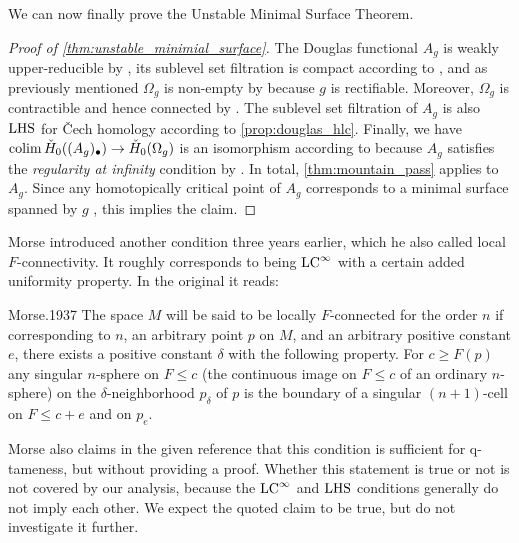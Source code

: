 We can now finally prove the Unstable Minimal Surface Theorem.


\begin{proof}[Proof of \cref{thm:unstable_minimial_surface}]
    The Douglas functional $A_g$ is weakly upper-reducible by \cite[Theorem 5.1]{Morse.1939}, its sublevel set filtration is compact according to \cite[p.~448]{Morse.1939}, and as previously mentioned $\Omega_g$ is non-empty by \cite[p.~267-268]{Douglas.1931} because $g$ is rectifiable.
    Moreover, $\Omega_g$ is contractible and hence connected by \cite[Theorem 4.3]{Morse.1939}.
    The sublevel set filtration of $A_g$ is also $\mathrm{LHS}$ for \v{C}ech homology according to \cref{prop:douglas_hlc}.
    Finally, we have $\operatorname*{colim} \check{H}_0((A_g)_{\bullet}) \to \check{H}_0(\Omega_g)$ is an isomorphism according to \cite[p.~444]{Morse.1939} because $A_g$ satisfies the \emph{regularity at infinity} condition by \cite[Theorem 4.3]{Morse.1939}.
    In total, \cref{thm:mountain_pass} applies to $A_g$.
    Since any homotopically critical point of $A_g$ corresponds to a minimal surface spanned by $g$ \cite[Theorem 6.2]{Morse.1939}, this implies the claim. 
\end{proof}

\begin{rem}
Morse introduced another condition three years earlier, which he also called local $F$-connectivity.
It roughly corresponds to being $\mathrm{LC}^\infty$ with a certain added uniformity property.
In the original it reads:
\begin{displaycquote}[p.421--422]{Morse.1937}
	The space $M$ will be said to be locally $F$-connected for the order $n$ if corresponding to $n$, an arbitrary point $p$ on $M$, and an arbitrary positive constant $e$, there exists a positive constant $\delta$ with the following property.
	For $c \geq F(p)$ any singular $n$-sphere on $F \leq c$ (the continuous image on $F \leq c$ of an ordinary $n$-sphere) on the $\delta$-neighborhood $p_{\delta}$ of $p$ is the boundary of a singular $(n + 1)$-cell on $F \leq c + e$ and on $p_e$.
\end{displaycquote}
Morse also claims in the given reference that this condition is sufficient for q-tameness, but without providing a proof.
Whether this statement is true or not is not covered by our analysis, because the $\mathrm{LC}^\infty$ and $\mathrm{LHS}$ conditions generally do not imply each other.
We expect the quoted claim to be true, but do not investigate it further.
\end{rem}
